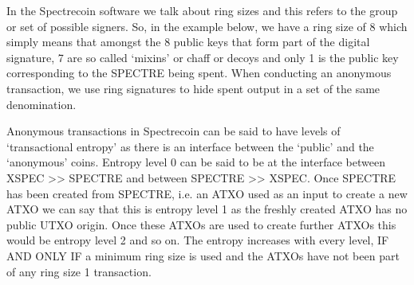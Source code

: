 In the Spectrecoin software we talk about ring sizes and this refers to the
group or set of possible signers. So, in the example below, we have a ring
size of 8 which simply means that amongst the 8 public keys that form part
of the digital signature, 7 are so called ‘mixins’ or chaff or decoys and
only 1 is the public key corresponding to the SPECTRE being spent. When
conducting an anonymous transaction, we use ring signatures to hide spent
output in a set of the same denomination.



Anonymous transactions in Spectrecoin can be said to have levels of
‘transactional entropy’ as there is an interface between the ‘public’
and the ‘anonymous’ coins. Entropy level 0 can be said to be at the
interface between XSPEC >> SPECTRE and between SPECTRE >> XSPEC. Once
SPECTRE has been created from SPECTRE, i.e. an ATXO used as an input to
create a new ATXO we can say that this is entropy level 1 as the freshly
created ATXO has no public UTXO origin. Once these ATXOs are used to
create further ATXOs this would be entropy level 2 and so on. The entropy
increases with every level, IF AND ONLY IF a minimum ring size is used and
the ATXOs have not been part of any ring size 1 transaction.
